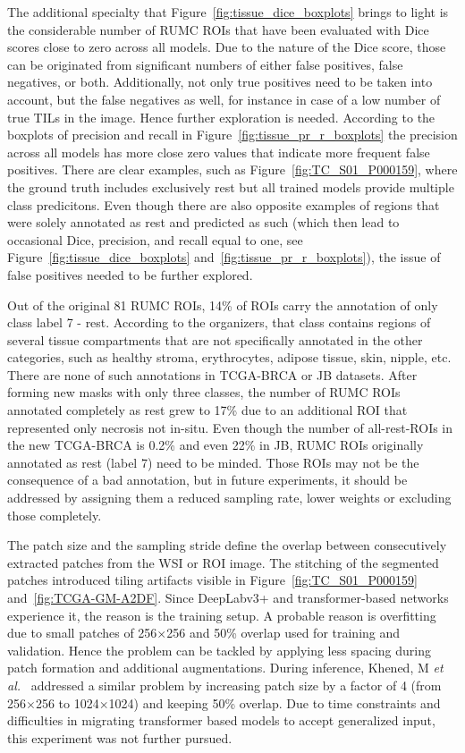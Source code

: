 The additional specialty that Figure~\ref*{fig:tissue_dice_boxplots} brings to light is
the considerable number of RUMC ROIs that have been evaluated with Dice scores close to
zero across all models. Due to the nature of the Dice score, those can be originated from
significant numbers of either false positives, false negatives, or both. 
Additionally, not only true positives need to be taken into account, but the false
negatives as well, for instance in case of a low number of true TILs in the image. 
Hence further exploration is needed.
According to the boxplots of precision and recall in Figure~\ref*{fig:tissue_pr_r_boxplots}
the precision across all models has more close zero values that indicate more frequent
false positives. 
There are clear examples, such as Figure~\ref*{fig:TC_S01_P000159},
where the ground truth includes exclusively rest but all trained models provide multiple class predicitons.
Even though there are also opposite examples of regions that were solely annotated as rest and predicted as
such (which then lead to occasional Dice, precision, and recall equal to one, see Figure~\ref*{fig:tissue_dice_boxplots}
and~\ref*{fig:tissue_pr_r_boxplots}), the issue of false positives needed to be further explored.

Out of the original 81 RUMC ROIs, 14\% of ROIs carry the annotation of only class label 7 - rest.
According to the organizers, that class contains regions of several tissue compartments that are not
specifically annotated in the other categories, such as healthy stroma, erythrocytes, adipose tissue,
skin, nipple, etc. There are none of such annotations in TCGA-BRCA or JB datasets.
After forming new masks with only three classes, the number of RUMC ROIs annotated completely as rest grew
to 17\% due to an additional ROI that represented only necrosis not in-situ.
Even though the number of all-rest-ROIs in the new TCGA-BRCA is 0.2\% and even 22\% in JB, RUMC ROIs
originally annotated as rest (label 7) need to be minded.
Those ROIs may not be the consequence of a bad annotation, but in future experiments,
it should be addressed by assigning them a reduced sampling rate, lower weights or excluding those completely. 

The patch size and the sampling stride define the overlap between consecutively extracted
patches from the WSI or ROI image. The stitching of the segmented patches introduced tiling artifacts
visible in Figure~\ref*{fig:TC_S01_P000159} and~\ref*{fig:TCGA-GM-A2DF}.
Since DeepLabv3+ and transformer-based networks experience it, the reason is the training setup. 
A probable reason is overfitting due to small patches of 256$\times$256 and 50\% overlap used for training and validation.
Hence the problem can be tackled by
applying less spacing during patch formation and additional augmentations.
During inference, Khened, M \textit{et al.}~\cite*{khened2021generalized} addressed a similar
problem by increasing patch size by a factor of 4 (from 256$\times$256 to 1024$\times$1024)
and keeping 50\% overlap. Due to time constraints and difficulties in migrating transformer based
models to accept generalized input, this experiment was not further pursued.

